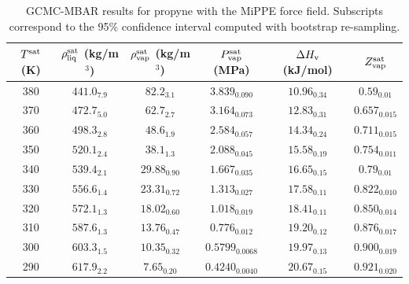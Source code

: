 \documentclass[journal=jctc,manuscript=article]{achemso}
\begin{document}
\begin{table}[htb!]
	\caption{GCMC-MBAR results for propyne with the MiPPE force field. Subscripts correspond to the 95\% confidence interval computed with bootstrap re-sampling.}
	\begin{center}
		\begin{tabular}{|c|c|c|c|c|c|}
			\hline
			$T^{\rm sat}$ (K) & $\rho_{\rm liq}^{\rm sat}$ (kg/m$^3$) & $\rho_{\rm vap}^{\rm sat}$ (kg/m$^3$) & $P_{\rm vap}^{\rm sat}$ (MPa) & $\Delta H_{\rm v}$ (kJ/mol) & $Z_{\rm vap}^{\rm sat}$ \\ \hline
            380 & $441.0_{7.9}$ & $82.2_{3.1}$ & $3.839_{0.090}$ & $10.96_{0.34}$ & $0.59_{0.01}$ \\
            370 & $472.7_{5.0}$ & $62.7_{2.7}$ & $3.164_{0.073}$ & $12.83_{0.31}$ & $0.657_{0.015}$ \\
            360 & $498.3_{2.8}$ & $48.6_{1.9}$ & $2.584_{0.057}$ & $14.34_{0.24}$ & $0.711_{0.015}$ \\
            350 & $520.1_{2.4}$ & $38.1_{1.3}$ & $2.088_{0.045}$ & $15.58_{0.19}$ & $0.754_{0.011}$ \\
            340 & $539.4_{2.1}$ & $29.88_{0.90}$ & $1.667_{0.035}$ & $16.65_{0.15}$ & $0.79_{0.01}$ \\
            330 & $556.6_{1.4}$ & $23.31_{0.72}$ & $1.313_{0.027}$ & $17.58_{0.11}$ & $0.822_{0.010}$ \\
            320 & $572.1_{1.3}$ & $18.02_{0.60}$ & $1.018_{0.019}$ & $18.41_{0.11}$ & $0.850_{0.014}$ \\
            310 & $587.6_{1.3}$ & $13.76_{0.47}$ & $0.776_{0.012}$ & $19.20_{0.12}$ & $0.876_{0.017}$ \\
            300 & $603.3_{1.5}$ & $10.35_{0.32}$ & $0.5799_{0.0068}$ & $19.97_{0.13}$ & $0.900_{0.019}$ \\
            290 & $617.9_{2.2}$ & $7.65_{0.20}$ & $0.4240_{0.0040}$ & $20.67_{0.15}$ & $0.921_{0.020}$ \\
			\hline
		\end{tabular}
	\end{center}
\end{table}
\end{document}
